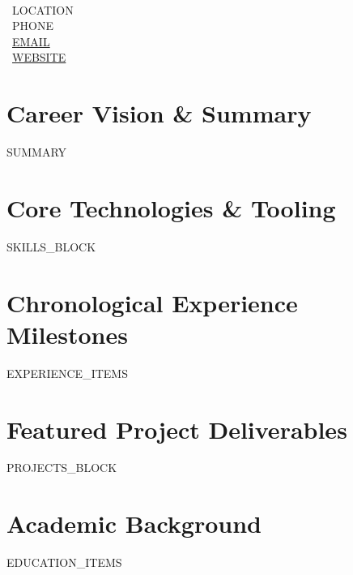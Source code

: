 \documentclass[10pt,letterpaper]{article}
\begin{document}
\begin{minipage}[t]{0.65\textwidth}
  {\LARGE \textbf{}} \\[3pt]
  {\small \textbf{}}
\end{minipage}
\hfill
\begin{minipage}[t]{0.33\textwidth}
  \raggedleft \small
  \faMapMarker* \ {{LOCATION}} \\
  \faPhone \ {{PHONE}} \\
  \faEnvelope \ \href{mailto:{{EMAIL}}}{{{EMAIL}}} \\
  \faGlobe \ \href{https://{{WEBSITE}}}{{{WEBSITE}}}
\end{minipage}

\vspace{6pt}

\section{Career Vision \& Summary}
\small
{{SUMMARY}}

\section{Core Technologies \& Tooling}
\small
{{SKILLS_BLOCK}}

\section{Chronological Experience Milestones}
\small
{{EXPERIENCE_ITEMS}}

\section{Featured Project Deliverables}
\small
{{PROJECTS_BLOCK}}

\section{Academic Background}
\small
{{EDUCATION_ITEMS}}
\end{document}
